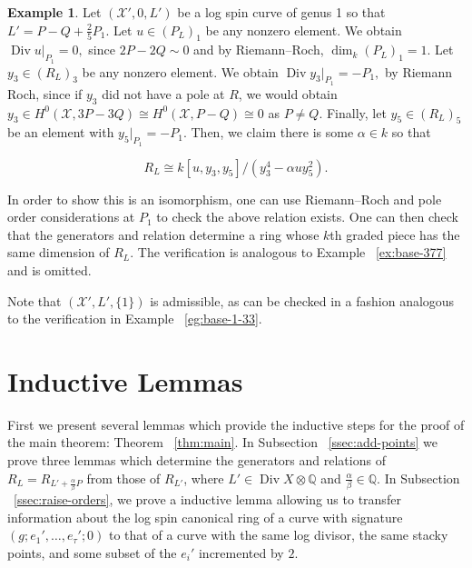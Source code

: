 \documentclass{amsart}
\theoremstyle{plain}
\theoremstyle{definition}
\newtheorem{example}[thm]{Example}
\theoremstyle{remark}
\numberwithin{equation}{section}
\newcommand\BQ{{\mathbb Q}}
\newcommand \sx{\mathscr X}
\DeclareMathOperator\di{Div}
\newcommand{\halfcan}{L}
\begin{document}
\begin{example}
\label{eg:exception-1-5}
Let $(\sx', 0, L')$ be a log spin curve of genus 1 so that $L' = P - Q + \frac{2}{5}P_1.$ Let $u \in (P_L)_1$ be any nonzero element. We obtain $\di u|_{P_1} = 0,$ since $2P -2Q \sim 0$ and by Riemann--Roch, $\dim_k (P_L)_1 = 1.$ Let $y_3 \in (R_L)_3$ be any nonzero element. We obtain $\di y_3|_{P_1} = - P_1,$ by Riemann Roch, since if $y_3$ did not have a pole at $R$, we would obtain $y_3 \in H^0(\sx,3P-3Q) \cong H^0(\sx, P - Q) \cong 0$ as $P \neq Q$. Finally, let $y_5 \in (R_L)_5$ be an element with $y_5|_{P_1} = -P_1$. Then, we claim there is some $\alpha \in k$ so that

$$R_L \cong k[u, y_3, y_5]/(y_3^4 - \alpha uy_5^2).$$

In order to show this is an isomorphism, one can use Riemann--Roch and pole order considerations at $P_1$ to check the above relation exists. One can then check that the generators and relation determine a ring whose $k$th graded piece has the same dimension of $R_L$. The verification is analogous to Example ~\ref{ex:base-377} and is omitted.

Note that $(\sx', \halfcan', \{1\})$ is admissible, as can be checked in a fashion analogous to the verification in Example ~\ref{eg:base-1-33}.
\end{example}




\section{Inductive Lemmas}
\label{sec:induction}
First we present several lemmas which provide the
inductive steps for the proof of the main theorem: Theorem
~\ref{thm:main}. In Subsection ~\ref{ssec:add-points} we prove three lemmas
	which determine the generators and relations of $R_\halfcan=R_{\halfcan' + \frac{\alpha
}{\beta}P}$ from those of $R_{\halfcan'}$, where
$\halfcan' \in \di
X \otimes \BQ $ and  $\frac{\alpha}{\beta} \in \BQ$. 
In
Subsection ~\ref{ssec:raise-orders}, we prove a inductive lemma allowing us to transfer information about the log spin canonical ring of a curve with signature $(g; e_1', 
\ldots, e_\tau'; 0)$ to that of a
curve with the same log divisor, the same stacky points, and some subset of the $e_ i'$ incremented by $2$. 
\end{document}
